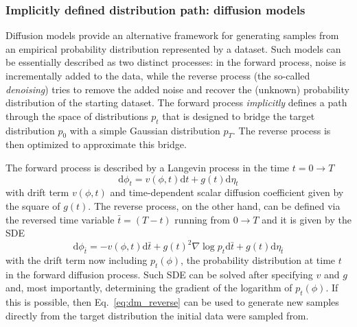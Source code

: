 \documentclass[12pt]{article}
\begin{document}
\subsubsection{Implicitly defined distribution path: diffusion models}

Diffusion models provide an alternative framework for generating samples from an empirical probability distribution represented by a dataset. Such models can be essentially described as two distinct processes: in the forward process, noise is incrementally added to the data, while the reverse process (the so-called \textit{denoising}) tries to remove the added noise and recover the (unknown) probability distribution of the starting dataset. The forward process \emph{implicitly} defines a path through the space of distributions $p_t$ that is designed to bridge the target distribution $p_0$ with a simple Gaussian distribution $p_T$. The reverse process is then optimized to approximate this bridge.

The forward process is described by a Langevin process in the time $t = 0 \to T$ 
\begin{equation}
    \mathrm{d} \phi_t = v(\phi,t) \mathrm{d} t + g(t) \mathrm{d} \eta_t
\end{equation}
with drift term $v(\phi,t)$ and time-dependent scalar diffusion coefficient given by the square of $g(t)$.
The reverse process, on the other hand, can be defined via the reversed time variable $\bar{t}=(T-t)$ running from $0 \to T$ and it is given by the SDE
\begin{equation}
\label{eq:dm_reverse}
    \mathrm{d} \phi_{\bar{t}} = -v(\phi,t) \mathrm{d} \bar{t} + g(t)^2 \nabla \log{p}_t \mathrm{d}\bar{t} + g(t) \mathrm{d}\eta_{\bar{t}}
\end{equation}
with the drift term now including $p_t(\phi)$, the probability distribution at time $t$ in the forward
diffusion process. Such SDE can be solved after specifying $v$ and $g$ and, most importantly, determining the gradient of the logarithm of $p_t(\phi)$. If this is possible, then Eq.~\eqref{eq:dm_reverse} can be used to generate new samples directly from the target distribution the initial data were sampled from.
\end{document}
